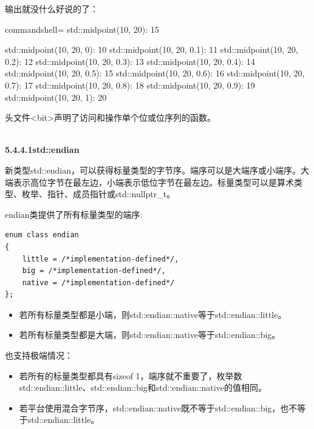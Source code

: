输出就没什么好说的了：

\begin{tcblisting}{commandshell={}}
std::midpoint(10, 20): 15

std::midpoint(10, 20, 0): 10
std::midpoint(10, 20, 0.1): 11
std::midpoint(10, 20, 0.2): 12
std::midpoint(10, 20, 0.3): 13
std::midpoint(10, 20, 0.4): 14
std::midpoint(10, 20, 0.5): 15
std::midpoint(10, 20, 0.6): 16
std::midpoint(10, 20, 0.7): 17
std::midpoint(10, 20, 0.8): 18
std::midpoint(10, 20, 0.9): 19
std::midpoint(10, 20, 1): 20
\end{tcblisting}


头文件<bit>声明了访问和操作单个位或位序列的函数。

\hspace*{\fill} \\ %
\noindent
\textbf{5.4.4.1\hspace{0.2cm}std::endian}

新类型std::endian，可以获得标量类型的字节序。端序可以是大端序或小端序。大端表示高位字节在最左边，小端表示低位字节在最左边。标量类型可以是算术类型、枚举、指针、成员指针或std::nullptr\_t。

endian类提供了所有标量类型的端序:

\begin{lstlisting}[style=styleCXX]
enum class endian
{
	little = /*implementation-defined*/,
	big = /*implementation-defined*/,
	native = /*implementation-defined*/
};
\end{lstlisting}

\begin{itemize}
\item 
若所有标量类型都是小端，则std::endian::native等于std::endian::little。

\item 
若所有标量类型都是大端，则std::endian::native等于std::endian::big。
\end{itemize}

也支持极端情况：

\begin{itemize}
\item 
若所有的标量类型都具有sizeof 1，端序就不重要了，枚举数std::endian::little、std::endian::big和std::endian::native的值相同。

\item 
若平台使用混合字节序，std::endian::native既不等于std::endian::big，也不等于std::endian::little。
\end{itemize}

